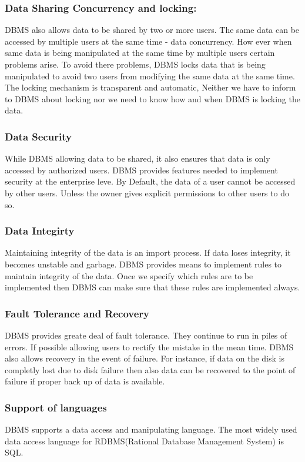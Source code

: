 \documentclass[11pt]{article}
\begin{document}
\subsubsection{Data Sharing Concurrency and locking:}
\label{sec:org5e0c6d1}
DBMS also allows data to be shared by two or more users. The same data can be accessed by multiple users at the same time - data concurrency.
How ever when same data is being manipulated at the same time by multiple users certain problems arise. To avoid there problems, DBMS locks data that is being manipulated to avoid two users from modifying the same data at the same time.
The locking mechanism is transparent and automatic, Neither we have to inform to DBMS about locking nor we need to know how and when DBMS is locking the data.
\subsubsection{Data Security}
\label{sec:orgb6e5ed7}
While DBMS allowing data to be shared, it also ensures that data is only accessed by authorized users.
DBMS provides features needed to implement security at the enterprise leve.
By Default, the data of a user cannot be accessed by other users. Unless the owner gives explicit permissions to other users to do so.
\subsubsection{Data Integirty}
\label{sec:org83ab9bb}
Maintaining integrity of the data is an import process. If data loses integrity, it becomes unstable and garbage.
DBMS provides means to implement rules to maintain integrity of the data. Once we specify which rules are to be implemented then DBMS can make sure that these rules are implemented always.
\subsubsection{Fault Tolerance and Recovery}
\label{sec:orgc93b1bc}
DBMS provides greate deal of fault tolerance. They continue to run in piles of errors. If possible allowing users to rectify the mistake in the mean time. DBMS also allows recovery in the event of failure. For instance, if data on the disk is completly lost due to disk failure then also data can be recovered to the point of failure if proper back up of data is available.
\subsubsection{Support of languages}
\label{sec:orge0d69f8}
DBMS supports a data access and manipulating language. The most widely used data access language for RDBMS(Rational Database Management System) is SQL.
\end{document}
